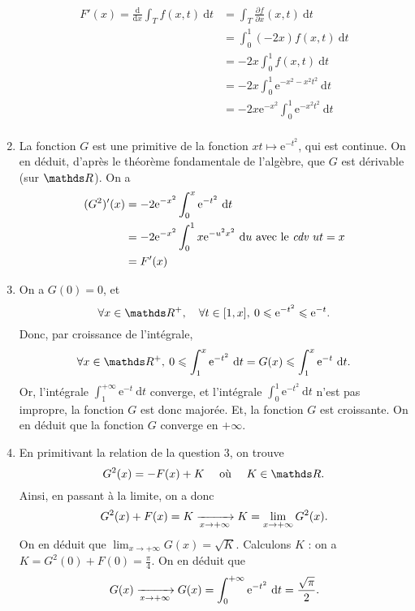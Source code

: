\begin{enumerate}
\begin{itemize}
		\end{itemize}
		\begin{align*}
			F'(x) = \frac{\mathrm{d}}{\mathrm{d}x} \int_{T} f(x,t)~\mathrm{d}t &= \int_{T} \frac{\partial f}{\partial x}(x,t)~\mathrm{d}t\\
			&= \int_{0}^{1} (-2x) f(x,t)~\mathrm{d}t \\
			&= -2x \int_{0}^{1} f(x,t)~\mathrm{d}t \\
			&= -2x \int_{0}^{1} \mathrm{e}^{-x^2 -x^2t^2}~\mathrm{d}t \\
			&= -2x \mathrm{e}^{-x^2} \int_{0}^{1} \mathrm{e}^{-x^2t^2}~\mathrm{d}t \\
		\end{align*}
	\item La fonction $G$\/ est une primitive de la fonction $xt \mapsto \mathrm{e}^{-t^2}$, qui est continue. On en déduit, d'après le théorème fondamentale de l'algèbre, que $G$\/ est dérivable (sur $\R$).
		On a
		\begin{align*}
			(G^2)'(x) &= -2\mathrm{e}^{-x^2} \int_{0}^{x} \mathrm{e}^{-t^2}~\mathrm{d}t\\
			&= -2 \mathrm{e}^{-x^2} \int_{0}^{1} x \mathrm{e}^{-u^2 x^2}~\mathrm{d}u  \text{ avec le \textit{cdv} $ut = x$\/}\\
			&= F'(x) \\
		\end{align*}
	\item On a $G(0) = 0$, et \[
			\forall x \in \R^+,\quad\forall t \in [1,x],\: 0 \le \mathrm{e}^{-t^2} \le \mathrm{e}^{-t}
		.\] Donc, par croissance de l'intégrale, \[
			\forall x \in \R^+,\: 0 \le\int_{1}^{x} \mathrm{e}^{-t^2}~\mathrm{d}t = G(x) \le \int_{1}^{x} \mathrm{e}^{-t}~\mathrm{d}t
		.\] Or, l'intégrale $\int_{1}^{+\infty} \mathrm{e}^{-t}~\mathrm{d}t$\/ converge, et l'intégrale $\int_{0}^{1} \mathrm{e}^{-t^2}~\mathrm{d}t$\/ n'est pas impropre, la fonction $G$\/ est donc majorée. Et, la fonction $G$\/ est croissante. On en déduit que la fonction $G$\/ converge en $+\infty$.
	\item En primitivant la relation de la question 3, on trouve \[
			G^2(x) = -F(x) + K \quad\text{ où }\quad K \in \R
		.\] Ainsi, en passant à la limite, on a donc \[
			G^2(x) + F(x) = K \xrightarrow[x \to +\infty]{} K = \lim_{x\to +\infty}G^2(x)
		.\]
		On en déduit que $\lim_{x\to +\infty} G(x) = \sqrt{K}$. Calculons $K$\/ : on a $K = G^2(0) + F(0) = \frac{\pi}{4}$. On en déduit que \[
			G(x)\xrightarrow[x\to +\infty]{} G(x) = \int_{0}^{+\infty} \mathrm{e}^{-t^2}~\mathrm{d}t = \frac{\sqrt{\pi}}{2}
		.\]
\end{enumerate}

